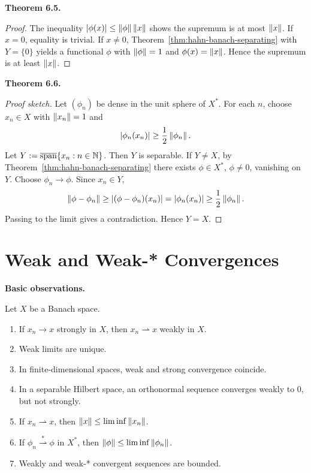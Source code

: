 \documentclass[11pt]{article}
\newenvironment{theoremstmt}[1]{%
  \par\medskip\noindent\textbf{Theorem #1. }\itshape
}{\par\medskip}
\newenvironment{namedstmt}[1]{%
  \par\medskip\noindent\textbf{#1. }\itshape
}{\par\medskip}
\begin{document}
\begin{theoremstmt}{6.5}
\thmNormViaDual
\end{theoremstmt}

\begin{proof}
The inequality $\left\lvert \phi(x)\right\rvert\le \left\lVert \phi\right\rVert\left\lVert x\right\rVert$ shows the supremum is at most $\left\lVert x\right\rVert$. If $x=0$, equality is trivial. If $x\neq 0$, Theorem~\ref{thm:hahn-banach-separating} with $Y=\{0\}$ yields a functional $\phi$ with $\left\lVert \phi\right\rVert=1$ and $\phi(x)=\left\lVert x\right\rVert$. Hence the supremum is at least $\left\lVert x\right\rVert$.
\end{proof}

\begin{theoremstmt}{6.6}
\thmDualSeparableImpliesSeparable
\end{theoremstmt}

\begin{proof}[Proof sketch]
Let $(\phi_n)$ be dense in the unit sphere of $X^*$. For each $n$, choose $x_n\in X$ with $\left\lVert x_n\right\rVert=1$ and
\[
\left\lvert \phi_n(x_n)\right\rvert\ge \frac12\left\lVert \phi_n\right\rVert.
\]
Let $Y:=\overline{\operatorname{span}}\{x_n:n\in\mathbb{N}\}$. Then $Y$ is separable. If $Y\neq X$, by Theorem~\ref{thm:hahn-banach-separating} there exists $\phi\in X^*$, $\phi\neq 0$, vanishing on $Y$. Choose $\phi_n\to\phi$. Since $x_n\in Y$,
\[
\left\lVert \phi-\phi_n\right\rVert\ge \left\lvert (\phi-\phi_n)(x_n)\right\rvert=\left\lvert \phi_n(x_n)\right\rvert\ge \frac12\left\lVert \phi_n\right\rVert.
\]
Passing to the limit gives a contradiction. Hence $Y=X$.
\end{proof}

\section{Weak and Weak-* Convergences}

\begin{namedstmt}{Basic observations}
Let $X$ be a Banach space.
\begin{enumerate}
\item If $x_n\to x$ strongly in $X$, then $x_n\rightharpoonup x$ weakly in $X$.
\item Weak limits are unique.
\item In finite-dimensional spaces, weak and strong convergence coincide.
\item In a separable Hilbert space, an orthonormal sequence converges weakly to $0$, but not strongly.
\item If $x_n\rightharpoonup x$, then $\left\lVert x\right\rVert\le \liminf\left\lVert x_n\right\rVert$.
\item If $\phi_n\overset{*}{\rightharpoonup}\phi$ in $X^*$, then $\left\lVert \phi\right\rVert\le \liminf\left\lVert \phi_n\right\rVert$.
\item Weakly and weak-* convergent sequences are bounded.
\end{enumerate}
\end{namedstmt}
\end{document}
